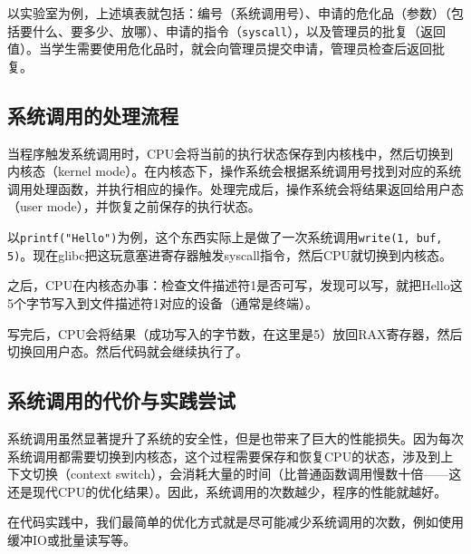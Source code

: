 \documentclass[../main.tex]{subfiles}
\begin{document}
以实验室为例，上述填表就包括：编号（系统调用号）、申请的危化品（参数）（包括要什么、要多少、放哪）、申请的指令（\texttt{syscall}），以及管理员的批复（返回值）。当学生需要使用危化品时，就会向管理员提交申请，管理员检查后返回批复。

\subsection{系统调用的处理流程}

当程序触发系统调用时，CPU会将当前的执行状态保存到内核栈中，然后切换到内核态（kernel mode）。在内核态下，操作系统会根据系统调用号找到对应的系统调用处理函数，并执行相应的操作。处理完成后，操作系统会将结果返回给用户态（user mode），并恢复之前保存的执行状态。

以\texttt{printf("Hello")}为例，这个东西实际上是做了一次系统调用\texttt{write(1, buf, 5)}。现在glibc把这玩意塞进寄存器触发syscall指令，然后CPU就切换到内核态。

之后，CPU在内核态办事：检查文件描述符1是否可写，发现可以写，就把Hello这5个字节写入到文件描述符1对应的设备（通常是终端）。

写完后，CPU会将结果（成功写入的字节数，在这里是5）放回RAX寄存器，然后切换回用户态。然后代码就会继续执行了。

\subsection{系统调用的代价与实践尝试}

系统调用虽然显著提升了系统的安全性，但是也带来了巨大的性能损失。因为每次系统调用都需要切换到内核态，这个过程需要保存和恢复CPU的状态，涉及到上下文切换（context switch），会消耗大量的时间（比普通函数调用慢数十倍——这还是现代CPU的优化结果）。因此，系统调用的次数越少，程序的性能就越好。

在代码实践中，我们最简单的优化方式就是尽可能减少系统调用的次数，例如使用缓冲IO或批量读写等。
\end{document}
